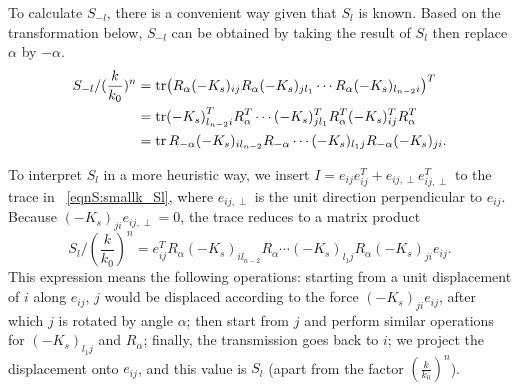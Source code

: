 \documentclass[
 amsmath,amssymb,
 aps,
 pre,
 longbibliography,
 10pt, onecolumn,
 notitlepage
]{revtex4-1}
\begin{document}
To calculate $S_{-l}$, there is a convenient way given that $S_l$ is known.
Based on the transformation below, $S_{-l}$ can be obtained by taking the result of $S_l$ then replace $\alpha$ by $-\alpha$.
\begin{equation} \label{eqnS:smallk_S-l}
    \begin{split}
    S_{-l} / (\frac{k}{k_0})^n
    &= \tr (R_\alpha (-K_s)_{ij} R_\alpha (-K_s)_{jl_1} \cdots R_\alpha  (-K_s)_{l_{n-2}i})^T \\
    &= \tr (-K_s)_{l_{n-2}i}^T R_\alpha^T \cdots (-K_s)_{jl_1}^T R_\alpha^T (-K_s)_{ij}^T R_\alpha^T \\
    &= \tr R_{-\alpha} (-K_s)_{il_{n-2}} R_{-\alpha} \cdots (-K_s)_{l_1j} R_{-\alpha} (-K_s)_{ji}.
    \end{split}
\end{equation}

To interpret $S_l$ in a more heuristic way, we insert $I = e_{ij}e_{ij}^T + e_{ij,\perp}e_{ij,\perp}^T$ to the trace in \eqnname~\eqref{eqnS:smallk_Sl}, where $e_{ij,\perp}$ is the unit direction perpendicular to $e_{ij}$.
Because $(-K_s)_{ji}e_{ij,\perp} = 0$, the trace reduces to a matrix product
\begin{equation} \label{eqnS:smallk_path_vector}
    S_l/(\frac{k}{k_0})^n = e_{ij}^T R_\alpha (-K_s)_{i l_{n-2}} R_\alpha \cdots (-K_s)_{l_1j} R_\alpha (-K_s)_{ji} e_{ij}.
\end{equation}
This expression means the following operations: 
starting from a unit displacement of $i$ along $e_{ij}$, $j$ would be displaced according to the force $(-K_s)_{ji} e_{ij}$, after which $j$ is rotated by angle $\alpha$; then start from $j$ and perform similar operations for $(-K_s)_{l_1j}$ and $R_\alpha$; finally, the transmission goes back to $i$; we project the displacement onto $e_{ij}$, and this value is $S_l$ (apart from the factor $(\frac{k}{k_0})^n$).
\end{document}
